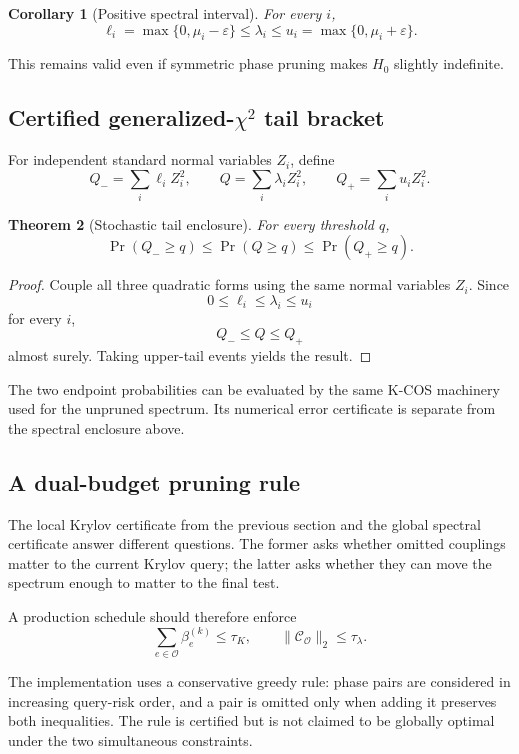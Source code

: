 \documentclass[11pt]{article}
\newtheorem{theorem}{Theorem}[section]
\newtheorem{corollary}[theorem]{Corollary}
\theoremstyle{definition}
\theoremstyle{remark}
\begin{document}
\begin{corollary}[Positive spectral interval]
For every \(i\),
\[
\boxed{
\ell_i
=
\max\{0,\mu_i-\varepsilon\}
\le
\lambda_i
\le
u_i
=
\max\{0,\mu_i+\varepsilon\}.
}
\]
\end{corollary}

This remains valid even if symmetric phase pruning makes \(H_0\) slightly
indefinite.

\subsection{Certified generalized-\texorpdfstring{\(\chi^2\)}{chi-square} tail bracket}

For independent standard normal variables \(Z_i\), define
\[
Q_-=\sum_i\ell_iZ_i^2,
\qquad
Q=\sum_i\lambda_iZ_i^2,
\qquad
Q_+=\sum_i u_iZ_i^2.
\]

\begin{theorem}[Stochastic tail enclosure]
For every threshold \(q\),
\[
\boxed{
\Pr(Q_-\ge q)
\le
\Pr(Q\ge q)
\le
\Pr(Q_+\ge q).
}
\]
\end{theorem}

\begin{proof}
Couple all three quadratic forms using the same normal variables \(Z_i\).
Since
\[
0\le\ell_i\le\lambda_i\le u_i
\]
for every \(i\),
\[
Q_-\le Q\le Q_+
\]
almost surely.  Taking upper-tail events yields the result.
\end{proof}

The two endpoint probabilities can be evaluated by the same K-COS machinery
used for the unpruned spectrum.  Its numerical error certificate is separate
from the spectral enclosure above.

\subsection{A dual-budget pruning rule}

The local Krylov certificate from the previous section and the global spectral
certificate answer different questions.  The former asks whether omitted
couplings matter to the current Krylov query; the latter asks whether they can
move the spectrum enough to matter to the final test.

A production schedule should therefore enforce
\[
\boxed{
\sum_{e\in\mathcal O}\beta_e^{(k)}
\le
\tau_K,
\qquad
\|\mathcal C_{\mathcal O}\|_2
\le
\tau_\lambda.
}
\]

The implementation uses a conservative greedy rule: phase pairs are considered
in increasing query-risk order, and a pair is omitted only when adding it
preserves both inequalities.  The rule is certified but is not claimed to be
globally optimal under the two simultaneous constraints.
\end{document}
